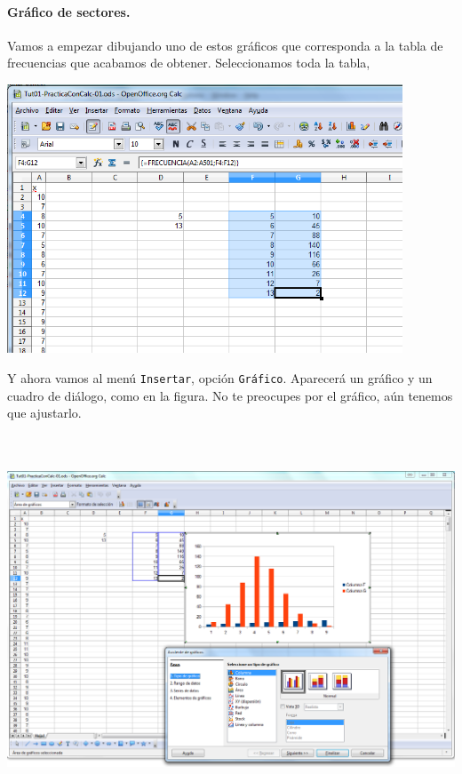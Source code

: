 \documentclass[10pt,a4paper]{article}\usepackage[]{graphicx}\usepackage[]{color}
\begin{document}
\paragraph{Gráfico de sectores.} Vamos a empezar dibujando uno de estos gráficos  que corresponda a la tabla de frecuencias que acabamos de obtener.
Seleccionamos toda la tabla,
    \begin{center}
    \includegraphics[height=8cm]{../fig/Tut01-Calc-Graficos-02.png}
    \end{center}
Y ahora vamos al menú {\tt Insertar}, opción {\tt Gráfico}. Aparecerá un gráfico y un cuadro de diálogo, como en la figura. No te preocupes por el gráfico, aún tenemos que ajustarlo.
    \begin{center}
    \includegraphics[height=11cm]{../fig/Tut01-Calc-Graficos-03.png}
    \end{center}
\end{document}
